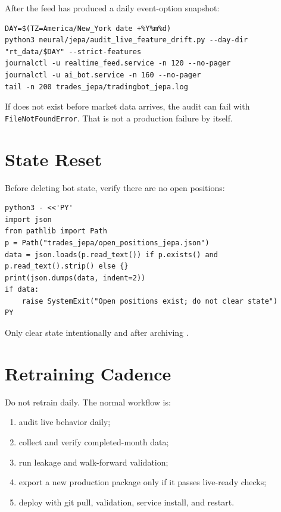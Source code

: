 \documentclass[11pt,a4paper]{article}
\begin{document}
After the feed has produced a daily event-option snapshot:

\begin{lstlisting}
DAY=$(TZ=America/New_York date +%Y%m%d)
python3 neural/jepa/audit_live_feature_drift.py --day-dir "rt_data/$DAY" --strict-features
journalctl -u realtime_feed.service -n 120 --no-pager
journalctl -u ai_bot.service -n 160 --no-pager
tail -n 200 trades_jepa/tradingbot_jepa.log
\end{lstlisting}

If  does not exist before market data arrives, the audit can fail with \texttt{FileNotFoundError}. That is not a production failure by itself.

\section{State Reset}

Before deleting bot state, verify there are no open positions:

\begin{lstlisting}
python3 - <<'PY'
import json
from pathlib import Path
p = Path("trades_jepa/open_positions_jepa.json")
data = json.loads(p.read_text()) if p.exists() and p.read_text().strip() else {}
print(json.dumps(data, indent=2))
if data:
    raise SystemExit("Open positions exist; do not clear state")
PY
\end{lstlisting}

Only clear state intentionally and after archiving .

\section{Retraining Cadence}

Do not retrain daily. The normal workflow is:

\begin{enumerate}
  \item audit live behavior daily;
  \item collect and verify completed-month data;
  \item run leakage and walk-forward validation;
  \item export a new production package only if it passes live-ready checks;
  \item deploy with git pull, validation, service install, and restart.
\end{enumerate}
\end{document}
